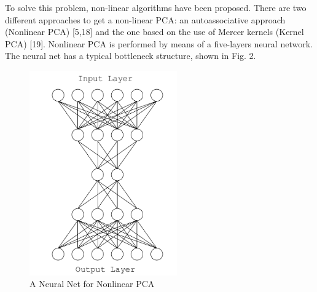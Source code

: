 \documentclass[journal]{IEEEtran}
\begin{document}
To solve this problem, non-linear algorithms have been proposed. There are two different approaches to get a non-linear PCA: 
an autoassociative approach (Nonlinear PCA) [5,18] and the one based on the use of Mercer kernels (Kernel PCA) [19].
Nonlinear PCA is performed by means of a five-layers neural network. The
neural net has a typical bottleneck structure, shown in Fig. 2. 

\begin{figure}[!t]
  \centering
  \includegraphics[width=2.5in]{fig-2.png}
  \caption{A Neural Net for Nonlinear PCA}
  \label{fig_sim_2}
\end{figure}
\end{document}
